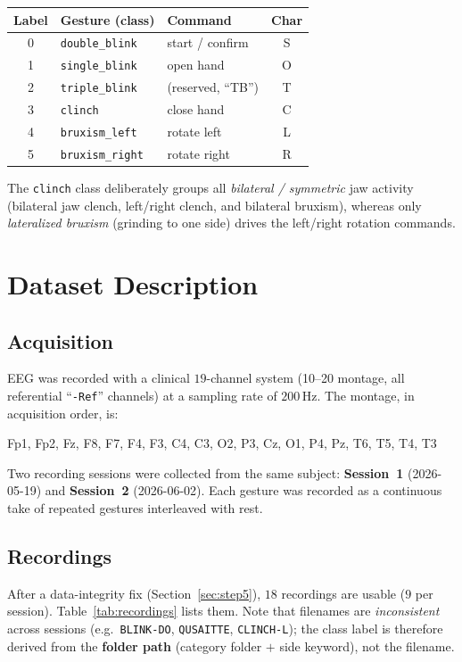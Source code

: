 \documentclass[11pt,a4paper]{article}
\newcommand{\code}[1]{\texttt{#1}}
\begin{document}
\begin{center}
\begin{tabular}{@{}cllc@{}}
\toprule
Label & Gesture (class) & Command & Char \\
\midrule
0 & \code{double\_blink}  & start / confirm & S \\
1 & \code{single\_blink}  & open hand       & O \\
2 & \code{triple\_blink}  & (reserved, ``TB'') & T \\
3 & \code{clinch}         & close hand      & C \\
4 & \code{bruxism\_left}  & rotate left     & L \\
5 & \code{bruxism\_right} & rotate right    & R \\
\bottomrule
\end{tabular}
\end{center}

\noindent
The \code{clinch} class deliberately groups all \emph{bilateral / symmetric} jaw
activity (bilateral jaw clench, left/right clench, and bilateral bruxism),
whereas only \emph{lateralized bruxism} (grinding to one side) drives the
left/right rotation commands.

\section{Dataset Description}
\subsection{Acquisition}
EEG was recorded with a clinical $19$-channel system (10--20 montage, all
referential ``\code{-Ref}'' channels) at a sampling rate of $200$\,Hz. The
montage, in acquisition order, is:

\begin{center}\small
Fp1, Fp2, Fz, F8, F7, F4, F3, C4, C3, O2, P3, Cz, O1, P4, Pz, T6, T5, T4, T3
\end{center}

\noindent
Two recording sessions were collected from the same subject:
\textbf{Session~1} (2026-05-19) and \textbf{Session~2} (2026-06-02). Each gesture
was recorded as a continuous take of repeated gestures interleaved with rest.

\subsection{Recordings}
After a data-integrity fix (Section~\ref{sec:step5}), $18$ recordings are usable
($9$ per session). Table~\ref{tab:recordings} lists them. Note that filenames are
\emph{inconsistent} across sessions (e.g.\ \code{BLINK-DO}, \code{QUSAITTE},
\code{CLINCH-L}); the class label is therefore derived from the
\textbf{folder path} (category folder $+$ side keyword), not the filename.
\end{document}
